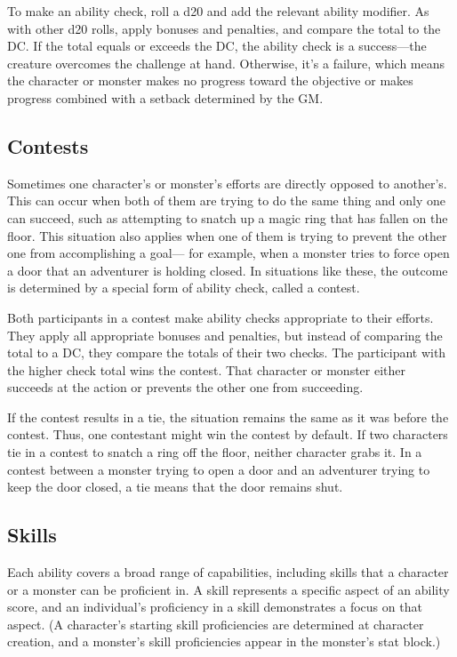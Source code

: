 To make an ability check, roll a d20 and add the relevant ability modifier. As with other d20 rolls, apply bonuses and penalties, and compare the total to the DC. If the total equals or exceeds the DC, the ability check is a success—the creature overcomes the challenge at hand. Otherwise, it's a failure, which means the character or monster makes no progress toward the objective or makes progress combined with a setback determined by the GM.

\subsection{Contests}

Sometimes one character's or monster's efforts are directly opposed to another's. This can occur when both of them are trying to do the same thing and only one can succeed, such as attempting to snatch up a magic ring that has fallen on the floor. This situation also applies when one of them is trying to prevent the other one from accomplishing a goal— for example, when a monster tries to force open a door that an adventurer is holding closed. In situations like these, the outcome is determined by a special form of ability check, called a contest.

Both participants in a contest make ability checks appropriate to their efforts. They apply all appropriate bonuses and penalties, but instead of comparing the total to a DC, they compare the totals of their two checks. The participant with the higher check total wins the contest. That character or monster either succeeds at the action or prevents the other one from succeeding.

If the contest results in a tie, the situation remains the same as it was before the contest. Thus, one contestant might win the contest by default. If two characters tie in a contest to snatch a ring off the floor, neither character grabs it. In a contest between a monster trying to open a door and an adventurer trying to keep the door closed, a tie means that the door remains shut.

\subsection{Skills}

Each ability covers a broad range of capabilities, including skills that a character or a monster can be proficient in. A skill represents a specific aspect of an ability score, and an individual's proficiency in a skill demonstrates a focus on that aspect. (A character's starting skill proficiencies are determined at character creation, and a monster's skill proficiencies appear in the monster's stat block.)

